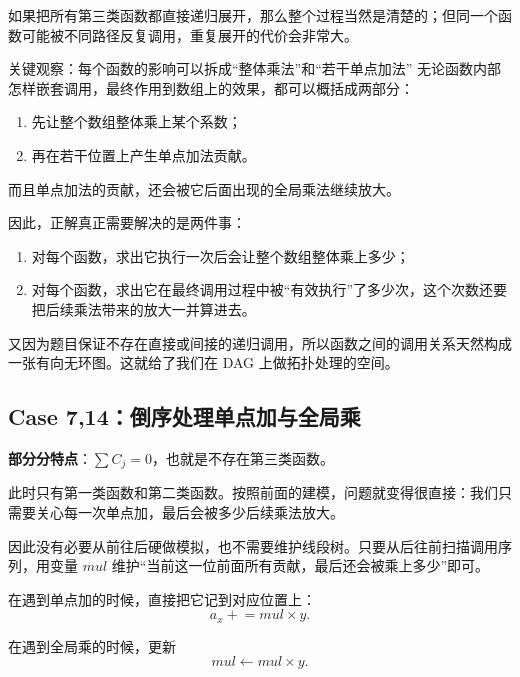\documentclass{book}
\begin{document}
如果把所有第三类函数都直接递归展开，那么整个过程当然是清楚的；但同一个函数可能被不同路径反复调用，重复展开的代价会非常大。

\begin{keybox}{关键观察：每个函数的影响可以拆成“整体乘法”和“若干单点加法”}
无论函数内部怎样嵌套调用，最终作用到数组上的效果，都可以概括成两部分：

\begin{enumerate}[leftmargin=2em,itemsep=1pt,topsep=2pt,parsep=0pt,partopsep=0pt]
    \item 先让整个数组整体乘上某个系数；
    \item 再在若干位置上产生单点加法贡献。
\end{enumerate}

而且单点加法的贡献，还会被它后面出现的全局乘法继续放大。
\end{keybox}

因此，正解真正需要解决的是两件事：

\begin{enumerate}[leftmargin=2em,itemsep=1pt,topsep=2pt,parsep=0pt,partopsep=0pt]
    \item 对每个函数，求出它执行一次后会让整个数组整体乘上多少；
    \item 对每个函数，求出它在最终调用过程中被“有效执行”了多少次，这个次数还要把后续乘法带来的放大一并算进去。
\end{enumerate}

又因为题目保证不存在直接或间接的递归调用，所以函数之间的调用关系天然构成一张有向无环图。这就给了我们在 DAG 上做拓扑处理的空间。

\subsection{Case 7,14：倒序处理单点加与全局乘}
\textbf{部分分特点}：$\sum C_j = 0$，也就是不存在第三类函数。

此时只有第一类函数和第二类函数。按照前面的建模，问题就变得很直接：我们只需要关心每一次单点加，最后会被多少后续乘法放大。

因此没有必要从前往后硬做模拟，也不需要维护线段树。只要从后往前扫描调用序列，用变量 $mul$ 维护“当前这一位前面所有贡献，最后还会被乘上多少”即可。

在遇到单点加的时候，直接把它记到对应位置上：
\[
a_x \mathrel{+}= mul\times y.
\]

在遇到全局乘的时候，更新
\[
mul\leftarrow mul\times y.
\]
\end{document}
